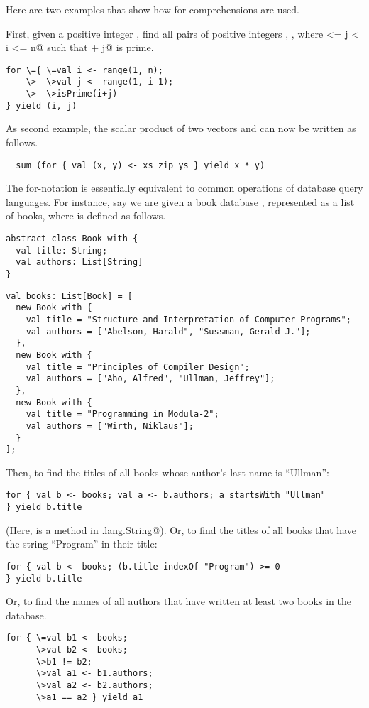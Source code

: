 \documentclass[11pt]{report}
\begin{document}
Here are two examples that show how for-comprehensions are used.

First, given a positive integer \verb@n@, find all pairs of positive
integers
\verb@i@, \verb@j@, where  <= j < i <= n@ such that \verb@i + j@ is prime.
\begin{verbatim}
for \={ \=val i <- range(1, n);
    \>  \>val j <- range(1, i-1);
    \>  \>isPrime(i+j)
} yield (i, j)
\end{verbatim}

As second example, the scalar product of two vectors \verb@xs@ and
\verb@ys@ can now be written as
follows.
\begin{verbatim}
  sum (for { val (x, y) <- xs zip ys } yield x * y)
\end{verbatim}
The for-notation is essentially equivalent to common operations of
database query languages.  For instance, say we are given a book
database \verb@books@, represented as a list of books, where
\verb@Book@ is defined as follows.
\begin{verbatim}
abstract class Book with {
  val title: String;
  val authors: List[String]
}
\end{verbatim}
\begin{verbatim}
val books: List[Book] = [
  new Book with {
    val title = "Structure and Interpretation of Computer Programs";
    val authors = ["Abelson, Harald", "Sussman, Gerald J."];
  },
  new Book with {
    val title = "Principles of Compiler Design";
    val authors = ["Aho, Alfred", "Ullman, Jeffrey"];
  },
  new Book with {
    val title = "Programming in Modula-2";
    val authors = ["Wirth, Niklaus"];
  }
];
\end{verbatim}
Then, to find the titles of all books whose author's last name is ``Ullman'':
\begin{verbatim}
for { val b <- books; val a <- b.authors; a startsWith "Ullman"
} yield b.title
\end{verbatim}
(Here, \verb@startsWith@ is a method in \verb@java.lang.String@).  Or,
to find the titles of all books that have the string ``Program'' in
their title:
\begin{verbatim}
for { val b <- books; (b.title indexOf "Program") >= 0
} yield b.title
\end{verbatim}
Or, to find the names of all authors that have written at least two
books in the database.
\begin{verbatim}
for { \=val b1 <- books;
      \>val b2 <- books;
      \>b1 != b2;
      \>val a1 <- b1.authors;
      \>val a2 <- b2.authors;
      \>a1 == a2 } yield a1
\end{verbatim}
\end{document}
